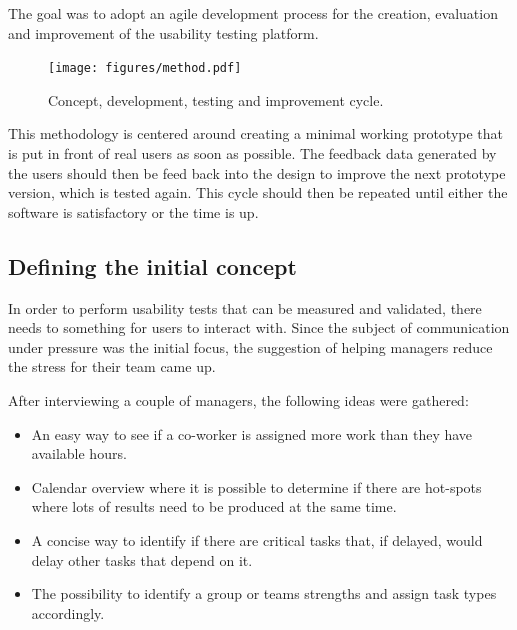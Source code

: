 \documentclass[nofilelist,dvipsnames]{cslthse-msc}
\begin{document}
        The goal was to adopt an agile development process{\findref} for the
        creation, evaluation and improvement of the usability testing platform.

        \begin{figure}[h!]
          \centering
          \texttt{[image: figures/method.pdf]}
          \caption{Concept, development, testing and improvement cycle.}
        \end{figure}

        This methodology is centered around creating a minimal
        working prototype{\findref} that is put in front of real users as soon
        as possible. The feedback data generated by the users should then be
        feed back into the design to improve the next prototype version, which
        is tested again. This cycle should then be repeated until either the
        software is satisfactory or the time is up.


      \subsection{Defining the initial concept}

        In order to perform usability tests that can be measured and validated,
        there needs to something for users to interact with. Since the subject
        of communication under pressure was the initial focus, the suggestion
        of helping managers reduce the stress for their team came up.

        After interviewing a couple of managers, the following ideas were
        gathered:

        \begin{itemize}
          \item{
            An easy way to see if a co-worker is assigned more work than they
            have available hours.
          }
          \item{
            Calendar overview where it is possible to determine if there are
            hot-spots where lots of results need to be produced at the same
            time.
          }
          \item{
            A concise way to identify if there are critical tasks that, if
            delayed, would delay other tasks that depend on it.
          }
          \item{
            The possibility to identify a group or teams strengths and assign
            task types accordingly.
          }
        \end{itemize}
\end{document}
